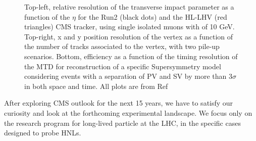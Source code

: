 \begin{figure}[h]
\caption{Top-left, relative resolution of the transverse impact
parameter as a function of the $\eta$ for the Run2 (black dots) and the
HL-LHV (red triangles) CMS tracker, using single isolated muons with
\pt of 10 GeV. Top-right, x and y position resolution of the vertex as a function of the
number of tracks associated to the vertex, with two pile-up scenarios. 
 Bottom, efficiency as a function of the timing
resolution of the MTD for reconstruction of a specific Supersymmetry
model considering events with a separation of
PV and SV by more than 3$\sigma$ in both space and time. All plots are
  from Ref~\cite{Alimena_2020}}
\label{fig:MDT_alimena}
\end{figure}

After exploring CMS outlook for the next 15 years, we have to satisfy
our curiosity and look at the forthcoming experimental landscape. We
focus only on the research program for long-lived particle at the LHC,
in the specific cases designed to probe HNLs.

